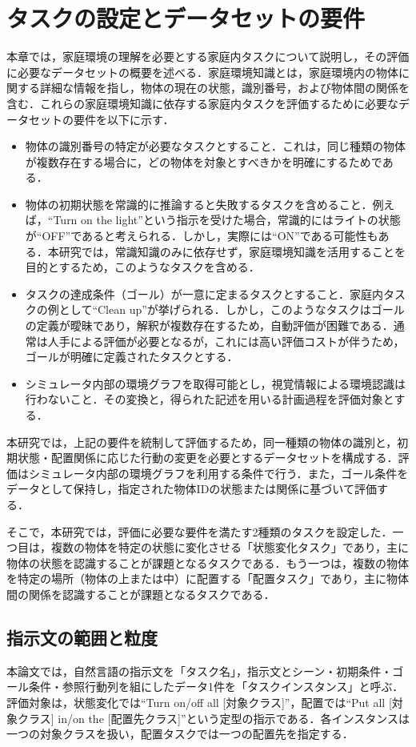 \section{タスクの設定とデータセットの要件} \label{sec3}
本章では，家庭環境の理解を必要とする家庭内タスクについて説明し，その評価に必要なデータセットの概要を述べる．家庭環境知識とは，家庭環境内の物体に関する詳細な情報を指し，物体の現在の状態，識別番号，および物体間の関係を含む．これらの家庭環境知識に依存する家庭内タスクを評価するために必要なデータセットの要件を以下に示す．

\begin{itemize}
    \item 物体の識別番号の特定が必要なタスクとすること．これは，同じ種類の物体が複数存在する場合に，どの物体を対象とすべきかを明確にするためである．
    \item 物体の初期状態を常識的に推論すると失敗するタスクを含めること．例えば，``Turn on the light''という指示を受けた場合，常識的にはライトの状態が``OFF''であると考えられる．しかし，実際には``ON''である可能性もある．本研究では，常識知識のみに依存せず，家庭環境知識を活用することを目的とするため，このようなタスクを含める．
    \item タスクの達成条件（ゴール）が一意に定まるタスクとすること．家庭内タスクの例として``Clean up''が挙げられる．しかし，このようなタスクはゴールの定義が曖昧であり，解釈が複数存在するため，自動評価が困難である．通常は人手による評価が必要となるが，これには高い評価コストが伴うため，ゴールが明確に定義されたタスクとする．
    \item シミュレータ内部の環境グラフを取得可能とし，視覚情報による環境認識は行わないこと．その変換と，得られた記述を用いる計画過程を評価対象とする．
\end{itemize}

本研究では，上記の要件を統制して評価するため，同一種類の物体の識別と，初期状態・配置関係に応じた行動の変更を必要とするデータセットを構成する．評価はシミュレータ内部の環境グラフを利用する条件で行う．また，ゴール条件をデータとして保持し，指定された物体IDの状態または関係に基づいて評価する．

そこで，本研究では，評価に必要な要件を満たす2種類のタスクを設定した．一つ目は，複数の物体を特定の状態に変化させる「状態変化タスク」であり，主に物体の状態を認識することが課題となるタスクである．もう一つは，複数の物体を特定の場所（物体の上または中）に配置する「配置タスク」であり，主に物体間の関係を認識することが課題となるタスクである．

\subsection{指示文の範囲と粒度}\label{sec3.instructions}
本論文では，自然言語の指示文を「タスク名」，指示文とシーン・初期条件・ゴール条件・参照行動列を組にしたデータ1件を「タスクインスタンス」と呼ぶ．評価対象は，状態変化では``Turn on/off all [対象クラス]''，配置では``Put all [対象クラス] in/on the [配置先クラス]''という定型の指示である．各インスタンスは一つの対象クラスを扱い，配置タスクでは一つの配置先を指定する．

